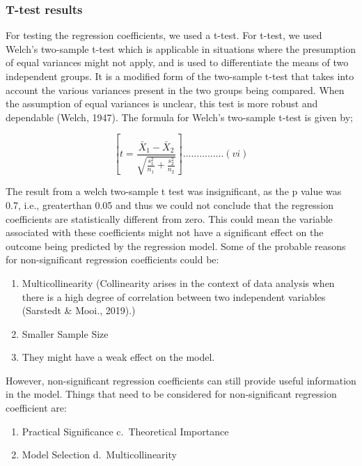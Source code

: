 \documentclass[preprint, 3p,
authoryear]{elsarticle} %
\begin{document}
\hypertarget{t-test-results}{%
\subsubsection{T-test results}\label{t-test-results}}

For testing the regression coefficients, we used a t-test. For t-test,
we used Welch's two-sample t-test which is applicable in situations
where the presumption of equal variances might not apply, and is used to
differentiate the means of two independent groups. It is a modified form
of the two-sample t-test that takes into account the various variances
present in the two groups being compared. When the assumption of equal
variances is unclear, this test is more robust and dependable (Welch,
1947). The formula for Welch's two-sample t-test is given by;

\[[ t = \frac{{\bar{X}_1 - \bar{X}_2}}{{\sqrt{\frac{{s_1^2}}{{n_1}} + \frac{{s_2^2}}{{n_2}}}}} ]...............(vi) \]

The result from a welch two-sample t test was insignificant, as the p
value was 0.7, i.e., greaterthan 0.05 and thus we could not conclude
that the regression coefficients are statistically different from zero.
This could mean the variable associated with these coefficients might
not have a significant effect on the outcome being predicted by the
regression model. Some of the probable reasons for non-significant
regression coefficients could be:

\begin{enumerate}
\def\labelenumi{\alph{enumi})}
\item
  Multicollinearity (Collinearity arises in the context of data analysis
  when there is a high degree of correlation between two independent
  variables (Sarstedt \& Mooi., 2019).)
\item
  Smaller Sample Size
\item
  They might have a weak effect on the model.
\end{enumerate}

However, non-significant regression coefficients can still provide
useful information in the model. Things that need to be considered for
non-significant regression coefficient are:

\begin{enumerate}
\def\labelenumi{\alph{enumi}.}
\item
  Practical Significance c.~Theoretical Importance
\item
  Model Selection d.~Multicollinearity
\end{enumerate}
\end{document}
